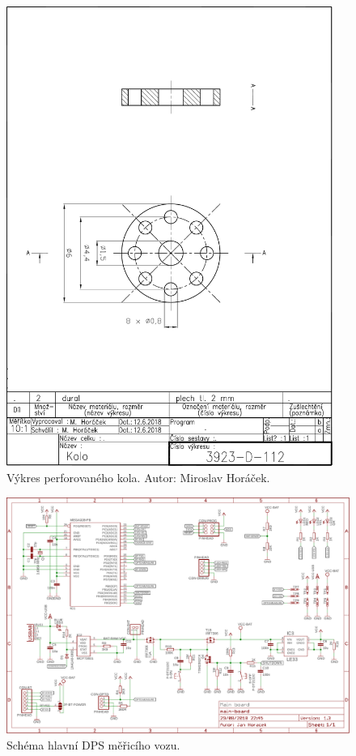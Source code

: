 \vspace{-2em}

\begin{figure}[H]
\includegraphics[width=0.95\textwidth]{data/wheel.pdf}
\caption{Výkres perforovaného kola. Autor: Miroslav Horáček.}
\label{fig:final-wheel}
\end{figure}

\begin{figure}[ht]
\includegraphics[angle=90,width=\textwidth]{data/wsm_main_board_v1_3.pdf}
\caption{Schéma hlavní DPS měřicího vozu.}
\label{fig:wsm-sch}
\end{figure}

